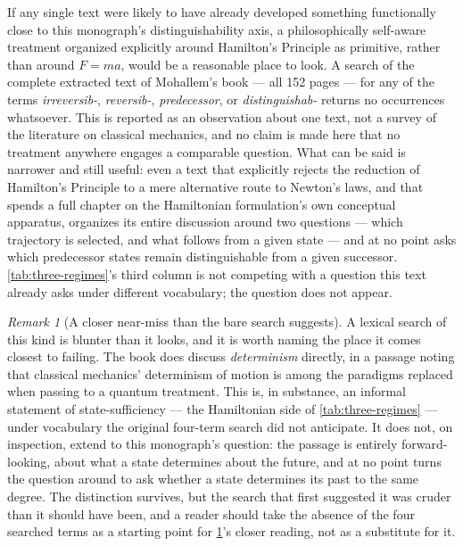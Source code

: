 \documentclass[11pt]{book}
\theoremstyle{plain}
\theoremstyle{definition}
\theoremstyle{remark}
\newtheorem{remark}[theorem]{Remark}
\begin{document}
If any single text were likely to have already developed something
functionally close to this monograph's distinguishability axis, a
philosophically self-aware treatment organized explicitly around
Hamilton's Principle as primitive, rather than around $F = ma$, would
be a reasonable place to look. A search of the complete extracted text
of Mohallem's book --- all 152 pages --- for any of the terms
\emph{irreversib-}, \emph{reversib-}, \emph{predecessor}, or
\emph{distinguishab-} returns no occurrences whatsoever. This is
reported as an observation about one text, not a survey of the
literature on classical mechanics, and no claim is made here that no
treatment anywhere engages a comparable question. What can be said is
narrower and still useful: even a text that explicitly rejects the
reduction of Hamilton's Principle to a mere alternative route to
Newton's laws, and that spends a full chapter on the Hamiltonian
formulation's own conceptual apparatus, organizes its entire
discussion around two questions --- which trajectory is selected, and
what follows from a given state --- and at no point asks which
predecessor states remain distinguishable from a given successor.
\cref{tab:three-regimes}'s third column is not competing with a
question this text already asks under different vocabulary; the
question does not appear.

\begin{remark}[A closer near-miss than the bare search suggests]
\label{rem:determinism-near-miss}
A lexical search of this kind is blunter than it looks, and it is
worth naming the place it comes closest to failing. The book does
discuss \emph{determinism} directly, in a passage noting that
classical mechanics' determinism of motion is among the paradigms
replaced when passing to a quantum treatment. This is, in substance,
an informal statement of state-sufficiency --- the Hamiltonian side of
\cref{tab:three-regimes} --- under vocabulary the original four-term
search did not anticipate. It does not, on inspection, extend to this
monograph's question: the passage is entirely forward-looking, about
what a state determines about the future, and at no point turns the
question around to ask whether a state determines its past to the
same degree. The distinction survives, but the search that first
suggested it was cruder than it should have been, and a reader should
take the absence of the four searched terms as a starting point for
\cref{rem:determinism-near-miss}'s closer reading, not as a
substitute for it.
\end{remark}
\end{document}
